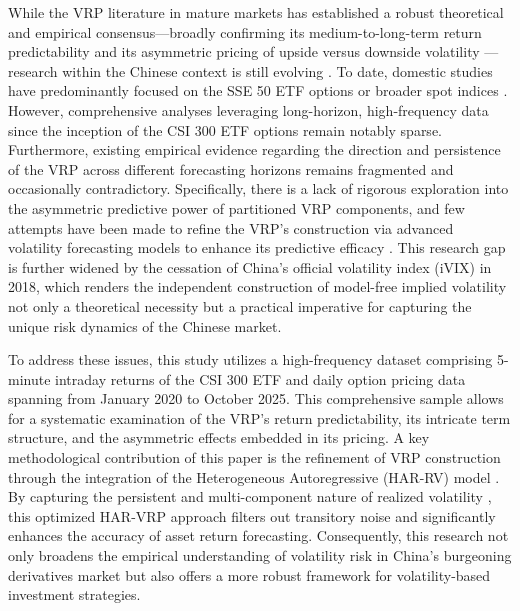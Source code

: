 \documentclass[a4paper, 12pt]{article}    %
\begin{document}
While the VRP literature in mature markets has established a robust theoretical and empirical consensus—broadly confirming its medium-to-long-term return predictability and its asymmetric pricing of upside versus downside volatility {\citep{bollerslev2014, londono2011variance}}—research within the Chinese context is still evolving {\citep{qiao2024variance}}. To date, domestic studies have predominantly focused on the SSE 50 ETF options or broader spot indices {\citep{chen2009volatility, zheng2013volatility}}. However, comprehensive analyses leveraging long-horizon, high-frequency data since the inception of the CSI 300 ETF options remain notably sparse. Furthermore, existing empirical evidence regarding the direction and persistence of the VRP across different forecasting horizons remains fragmented and occasionally contradictory. Specifically, there is a lack of rigorous exploration into the asymmetric predictive power of partitioned VRP components, and few attempts have been made to refine the VRP’s construction via advanced volatility forecasting models to enhance its predictive efficacy {\citep{timmermann2018forecasting}}. This research gap is further widened by the cessation of China’s official volatility index (iVIX) in 2018, which renders the independent construction of model-free implied volatility {\citep{brittenjones2000, carr2007variance}} not only a theoretical necessity but a practical imperative for capturing the unique risk dynamics of the Chinese market.


To address these issues, this study utilizes a high-frequency dataset comprising 5-minute intraday returns of the CSI 300 ETF and daily option pricing data spanning from January 2020 to October 2025. This comprehensive sample allows for a systematic examination of the VRP’s return predictability, its intricate term structure, and the asymmetric effects embedded in its pricing. A key methodological contribution of this paper is the refinement of VRP construction through the integration of the Heterogeneous Autoregressive (HAR-RV) model {\citep{corsi2012harmodeling}}. By capturing the persistent and multi-component nature of realized volatility {\citep{andersen1998, huang2016modeling}}, this optimized HAR-VRP approach filters out transitory noise and significantly enhances the accuracy of asset return forecasting. Consequently, this research not only broadens the empirical understanding of volatility risk in China’s burgeoning derivatives market but also offers a more robust framework for volatility-based investment strategies.
\end{document}
